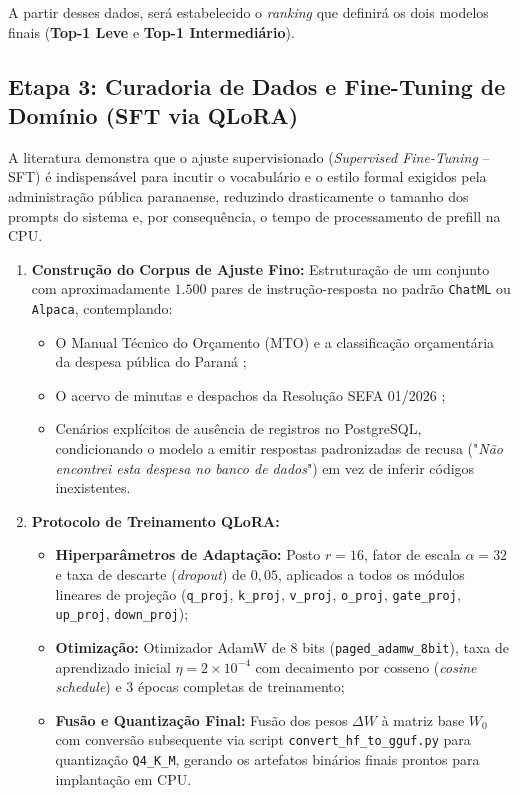 \documentclass[11pt]{article}
\begin{document}
A partir desses dados, será estabelecido o \textit{ranking} que definirá os dois modelos finais (\textbf{Top-1 Leve} e \textbf{Top-1 Intermediário}).

\subsection{Etapa 3: Curadoria de Dados e Fine-Tuning de Domínio (SFT via QLoRA)}
A literatura demonstra que o ajuste supervisionado (\textit{Supervised Fine-Tuning} -- SFT) é indispensável para incutir o vocabulário e o estilo formal exigidos pela administração pública paranaense, reduzindo drasticamente o tamanho dos prompts do sistema e, por consequência, o tempo de processamento de prefill na CPU.

\begin{enumerate}
    \item \textbf{Construção do Corpus de Ajuste Fino:} Estruturação de um conjunto com aproximadamente $1.500$ pares de instrução-resposta no padrão \texttt{ChatML} ou \texttt{Alpaca}, contemplando:
    \begin{itemize}
        \item O Manual Técnico do Orçamento (MTO) e a classificação orçamentária da despesa pública do Paraná \citep{mto_pr_2026};
        \item O acervo de minutas e despachos da Resolução SEFA 01/2026 \citep{resolucao_sefa_01_2026};
        \item Cenários explícitos de ausência de registros no PostgreSQL, condicionando o modelo a emitir respostas padronizadas de recusa ("\textit{Não encontrei esta despesa no banco de dados}") em vez de inferir códigos inexistentes.
    \end{itemize}
    \item \textbf{Protocolo de Treinamento QLoRA:}
    \begin{itemize}
        \item \textbf{Hiperparâmetros de Adaptação:} Posto $r = 16$, fator de escala $\alpha = 32$ e taxa de descarte (\textit{dropout}) de $0{,}05$, aplicados a todos os módulos lineares de projeção (\texttt{q\_proj}, \texttt{k\_proj}, \texttt{v\_proj}, \texttt{o\_proj}, \texttt{gate\_proj}, \texttt{up\_proj}, \texttt{down\_proj});
        \item \textbf{Otimização:} Otimizador AdamW de 8 bits (\texttt{paged\_adamw\_8bit}), taxa de aprendizado inicial $\eta = 2 \times 10^{-4}$ com decaimento por cosseno (\textit{cosine schedule}) e $3$ épocas completas de treinamento;
        \item \textbf{Fusão e Quantização Final:} Fusão dos pesos $\Delta W$ à matriz base $W_0$ com conversão subsequente via script \texttt{convert\_hf\_to\_gguf.py} para quantização \texttt{Q4\_K\_M}, gerando os artefatos binários finais prontos para implantação em CPU.
    \end{itemize}
\end{enumerate}
\end{document}
